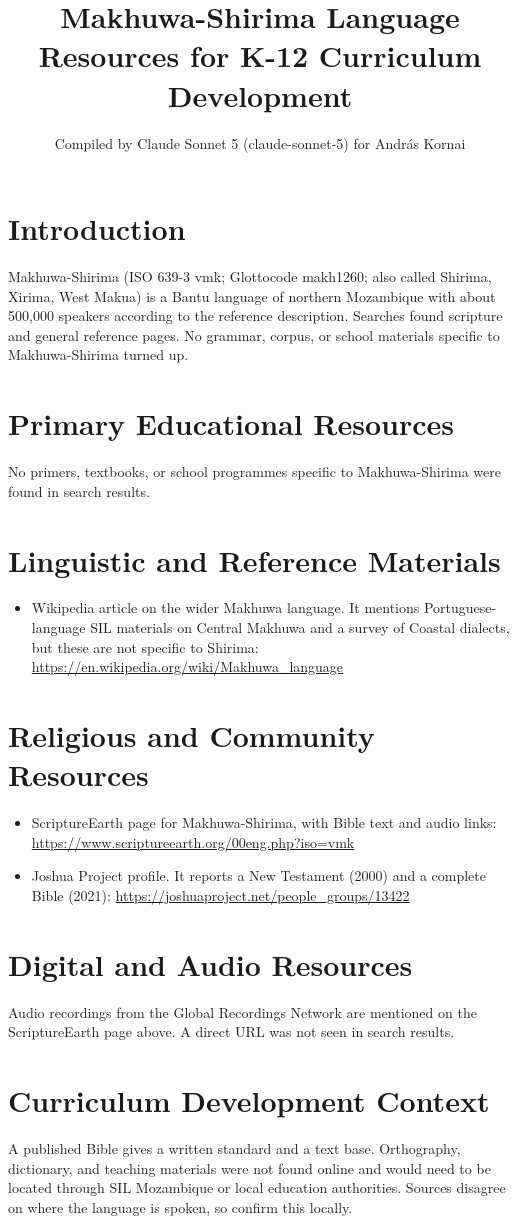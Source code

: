 \documentclass[12pt]{article}
\title{Makhuwa-Shirima Language Resources for K-12 Curriculum Development}
\author{Compiled by Claude Sonnet 5 (claude-sonnet-5) for Andr\'as Kornai}
\date{}
\begin{document}
\maketitle

\section{Introduction}
Makhuwa-Shirima (ISO 639-3 vmk; Glottocode makh1260; also called Shirima, Xirima, West Makua) is a Bantu language of northern Mozambique with about 500,000 speakers according to the reference description. Searches found scripture and general reference pages. No grammar, corpus, or school materials specific to Makhuwa-Shirima turned up.

\section{Primary Educational Resources}
No primers, textbooks, or school programmes specific to Makhuwa-Shirima were found in search results.

\section{Linguistic and Reference Materials}
\begin{itemize}
\item Wikipedia article on the wider Makhuwa language. It mentions Portuguese-language SIL materials on Central Makhuwa and a survey of Coastal dialects, but these are not specific to Shirima: \url{https://en.wikipedia.org/wiki/Makhuwa_language}
\end{itemize}

\section{Religious and Community Resources}
\begin{itemize}
\item ScriptureEarth page for Makhuwa-Shirima, with Bible text and audio links: \url{https://www.scriptureearth.org/00eng.php?iso=vmk}
\item Joshua Project profile. It reports a New Testament (2000) and a complete Bible (2021): \url{https://joshuaproject.net/people_groups/13422}
\end{itemize}

\section{Digital and Audio Resources}
Audio recordings from the Global Recordings Network are mentioned on the ScriptureEarth page above. A direct URL was not seen in search results.

\section{Curriculum Development Context}
A published Bible gives a written standard and a text base. Orthography, dictionary, and teaching materials were not found online and would need to be located through SIL Mozambique or local education authorities. Sources disagree on where the language is spoken, so confirm this locally.
\end{document}
